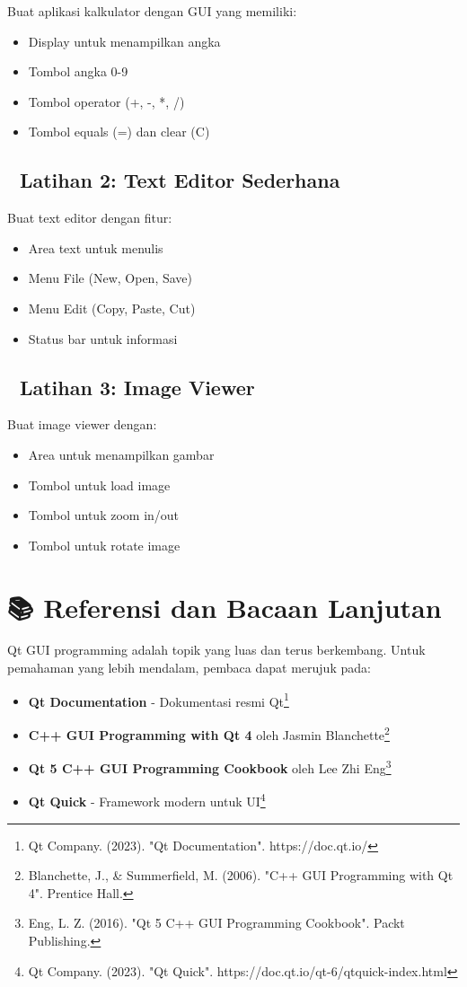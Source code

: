 Buat aplikasi kalkulator dengan GUI yang memiliki:
\begin{itemize}
\item Display untuk menampilkan angka
\item Tombol angka 0-9
\item Tombol operator (+, -, *, /)
\item Tombol equals (=) dan clear (C)
\end{itemize}

\subsection{📝 Latihan 2: Text Editor Sederhana}

Buat text editor dengan fitur:
\begin{itemize}
\item Area text untuk menulis
\item Menu File (New, Open, Save)
\item Menu Edit (Copy, Paste, Cut)
\item Status bar untuk informasi
\end{itemize}

\subsection{📝 Latihan 3: Image Viewer}

Buat image viewer dengan:
\begin{itemize}
\item Area untuk menampilkan gambar
\item Tombol untuk load image
\item Tombol untuk zoom in/out
\item Tombol untuk rotate image
\end{itemize}

\section{📚 Referensi dan Bacaan Lanjutan}

Qt GUI programming adalah topik yang luas dan terus berkembang. Untuk pemahaman yang lebih mendalam, pembaca dapat merujuk pada:

\begin{itemize}
\item \textbf{Qt Documentation} - Dokumentasi resmi Qt\footnote{Qt Company. (2023). "Qt Documentation". https://doc.qt.io/}
\item \textbf{C++ GUI Programming with Qt 4} oleh Jasmin Blanchette\footnote{Blanchette, J., \& Summerfield, M. (2006). "C++ GUI Programming with Qt 4". Prentice Hall.}
\item \textbf{Qt 5 C++ GUI Programming Cookbook} oleh Lee Zhi Eng\footnote{Eng, L. Z. (2016). "Qt 5 C++ GUI Programming Cookbook". Packt Publishing.}
\item \textbf{Qt Quick} - Framework modern untuk UI\footnote{Qt Company. (2023). "Qt Quick". https://doc.qt.io/qt-6/qtquick-index.html}
\end{itemize}

